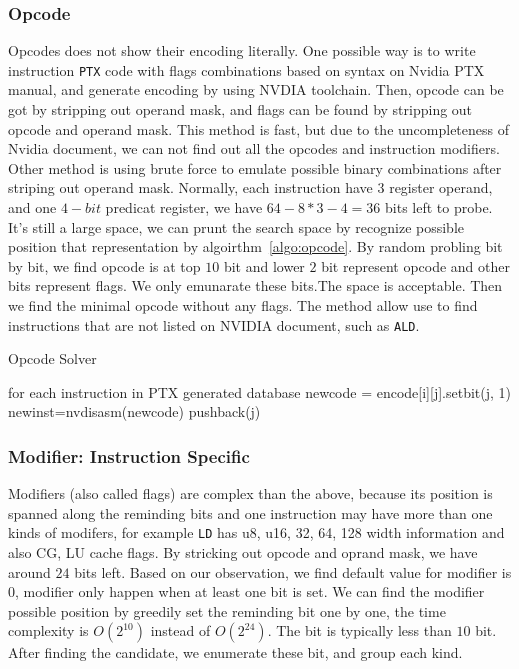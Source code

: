 \documentclass{sig-alternate-05-2015}
\begin{document}
\subsubsection{Opcode}
Opcodes does not show their encoding literally. One possible way is to write instruction {\tt PTX} code with flags
combinations based on syntax on Nvidia PTX manual, and generate encoding by using NVDIA toolchain.
Then, opcode can be got by stripping out operand mask, and flags can be found by stripping out opcode and operand mask.
This method is fast, but due to the uncompleteness of Nvidia document, we can not find out all the opcodes and
instruction modifiers.
Other method is using brute force to emulate possible binary combinations after striping out operand mask.
Normally, each instruction have $3$ register operand, and one $4-bit$ predicat register, we have $64-8*3-4=36$ bits left to probe.
It's still a large space,  we can prunt the search space by recognize possible position that representation by
algoirthm~\ref{algo:opcode}. By random probling bit by bit, we find opcode is at top $10$ bit and lower $2$ bit represent opcode and other bits represent flags. We only
emunarate these bits.The space is acceptable. Then we find the minimal opcode without any flags. The method allow use to find instructions
that are not listed on NVIDIA document, such as {\tt ALD}.

\begin{algorithm}
      \caption{Opcode Solver}\label{algo:opcode}
  \begin{algorithmic}[1]
      \State for each instruction in PTX generated database
      \State newcode = encode[i][j].setbit(j, 1)
      \State newinst=nvdisasm(newcode)
      \State pushback(j)
      \EndIf
      \EndIf
      \EndFor
      \EndFor
  \end{algorithmic}
\end{algorithm}

\subsubsection{Modifier: Instruction Specific}
Modifiers (also called flags) are complex than the above, because its position is spanned along the reminding bits and one instruction may have
more than one kinds of modifers, for example {\tt LD} has u8, u16, 32, 64, 128 width information and also CG, LU cache
flags. By stricking out opcode and oprand mask, we have around $24$ bits left. Based on our observation, we find
default value for modifier is $0$, modifier only happen when at least one bit is set. We can find the modifier possible position
by greedily set the reminding bit one by one, the time complexity is $O(2^{10})$ instead of $O(2^{24})$. The bit is typically less
than $10$ bit. After finding the candidate, we enumerate these bit, and group each kind.
\end{document}
